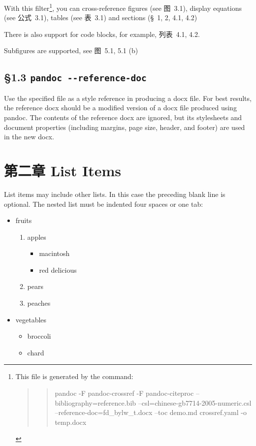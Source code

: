 \documentclass[
]{article}
\begin{document}
With this filter\footnote{This file is generated by the command:

  \begin{quote}
  \begin{quote}
  pandoc -F pandoc-crossref -F pandoc-citeproc
  --bibliography=reference.bib --csl=chinese-gb7714-2005-numeric.csl
  --reference-doc=fd\_bylw\_t.docx --toc demo.md crossref.yaml -o
  temp.docx
  \end{quote}
  \end{quote}}, you can cross-reference figures (see 图~3.1), display
equations (see 公式~3.1), tables (see 表~3.1) and sections (§~1, 2, 4.1,
4.2)

There is also support for code blocks, for example, 列表~4.1, 4.2.

Subfigures are supported, see 图~5.1, 5.1 (b)

\hypertarget{pandoc---reference-doc}{%
\subsection{\texorpdfstring{§1.3
\texttt{pandoc\ -\/-reference-doc}}{§1.3 pandoc -\/-reference-doc}}\label{pandoc---reference-doc}}

Use the specified file as a style reference in producing a docx file.
For best results, the reference docx should be a modified version of a
docx file produced using pandoc. The contents of the reference docx are
ignored, but its stylesheets and document properties (including margins,
page size, header, and footer) are used in the new docx.

\hypertarget{ux7b2cux4e8cux7ae0-list-items}{%
\section{第二章 List Items}\label{ux7b2cux4e8cux7ae0-list-items}}

List items may include other lists. In this case the preceding blank
line is optional. The nested list must be indented four spaces or one
tab:

\begin{itemize}
\item
  fruits

  \begin{enumerate}
  \def\labelenumi{\arabic{enumi}.}
  \item
    apples

    \begin{itemize}
    \item
      macintosh
    \item
      red delicious
    \end{itemize}
  \item
    pears
  \item
    peaches
  \end{enumerate}
\item
  vegetables

  \begin{itemize}
  \item
    broccoli
  \item
    chard
  \end{itemize}
\end{itemize}
\end{document}
